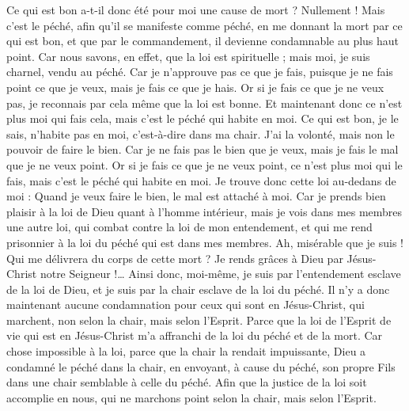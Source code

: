 \begin{multicols}{2}
Ce qui est bon a-t-il donc été pour moi une cause de mort ? Nullement ! Mais c’est le péché, afin qu'il se manifeste comme péché, en me donnant la mort par ce qui est bon, et que par le commandement, il devienne condamnable au plus haut point.
Car nous savons, en effet, que la loi est spirituelle ; mais moi, je suis charnel, vendu au péché.
Car je n'approuve pas ce que je fais, puisque je ne fais point ce que je veux, mais je fais ce que je hais.
Or si je fais ce que je ne veux pas, je reconnais par cela même que la loi est bonne.
Et maintenant donc ce n'est plus moi qui fais cela, mais c'est le péché qui habite en moi.
Ce qui est bon, je le sais, n’habite pas en moi, c’est-à-dire dans ma chair. J’ai la volonté, mais non le pouvoir de faire le bien.
Car je ne fais pas le bien que je veux, mais je fais le mal que je ne veux point.
Or si je fais ce que je ne veux point, ce n'est plus moi qui le fais, mais c'est le péché qui habite en moi.
Je trouve donc cette loi au-dedans de moi : Quand je veux faire le bien, le mal est attaché à moi.
Car je prends bien plaisir à la loi de Dieu quant à l'homme intérieur,
mais je vois dans mes membres une autre loi, qui combat contre la loi de mon entendement, et qui me rend prisonnier à la loi du péché qui est dans mes membres.
Ah, misérable que je suis ! Qui me délivrera du corps de cette mort ?
Je rends grâces à Dieu par Jésus-Christ notre Seigneur !… Ainsi donc, moi-même, je suis par l’entendement esclave de la loi de Dieu, et je suis par la chair esclave de la loi du péché.
\VerseOne{}Il n'y a donc maintenant aucune condamnation pour ceux qui sont en Jésus-Christ, qui marchent, non selon la chair, mais selon l'Esprit.
Parce que la loi de l'Esprit de vie qui est en Jésus-Christ m'a affranchi de la loi du péché et de la mort.
Car chose impossible à la loi, parce que la chair la rendait impuissante, Dieu a condamné le péché dans la chair, en envoyant, à cause du péché, son propre Fils dans une chair semblable à celle du péché.
Afin que la justice de la loi soit accomplie en nous, qui ne marchons point selon la chair, mais selon l'Esprit.
\end{multicols}

